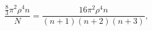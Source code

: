 \begin{equation}
\frac{\frac{8}{3}\pi^{2}\rho^{4} n}{N}
=\frac{16\pi^{2}\rho^{4}n}{(n+1)(n+2)(n+3)}, 
\end{equation}

